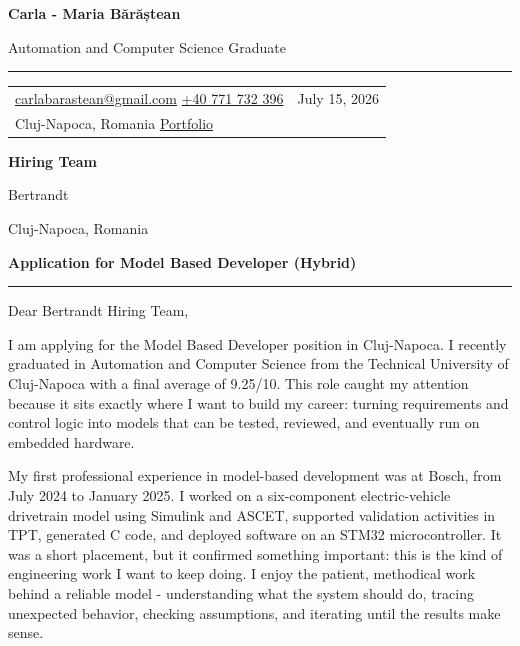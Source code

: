 \documentclass[11pt,a4paper]{article}
\newcommand{\contactseparator}{\hspace{0.55em}{\color{CVAccent}\textbar}\hspace{0.55em}}
\begin{document}
\color{CVInk}

{\fontsize{24}{28}\selectfont\bfseries Carla - Maria Bărăștean}\par
\vspace{0.08cm}
{\large Automation and Computer Science Graduate}\par

\vspace{0.28cm}
{\color{CVAccent}\rule{\textwidth}{1.2pt}}
\vspace{0.18cm}

\begin{tabularx}{\textwidth}{@{}Xr@{}}
\href{mailto:carlabarastean@gmail.com}{carlabarastean@gmail.com}
\contactseparator
\href{tel:+40771732396}{+40 771 732 396}
& July 15, 2026 \\
Cluj-Napoca, Romania
\contactseparator
\href{https://portofolio-carla-barastean.netlify.app}{Portfolio}
& \\
\end{tabularx}

\vspace{0.55cm}
\textbf{Hiring Team}\par
Bertrandt\par
Cluj-Napoca, Romania

\vspace{0.42cm}
{\large\bfseries Application for Model Based Developer (Hybrid)}\par
{\color{CVAccent}\rule{5.7cm}{0.8pt}}

\vspace{0.28cm}
Dear Bertrandt Hiring Team,

I am applying for the Model Based Developer position in Cluj-Napoca. I recently graduated in Automation and Computer Science from the Technical University of Cluj-Napoca with a final average of 9.25/10. This role caught my attention because it sits exactly where I want to build my career: turning requirements and control logic into models that can be tested, reviewed, and eventually run on embedded hardware.

My first professional experience in model-based development was at Bosch, from July 2024 to January 2025. I worked on a six-component electric-vehicle drivetrain model using Simulink and ASCET, supported validation activities in TPT, generated C code, and deployed software on an STM32 microcontroller. It was a short placement, but it confirmed something important: this is the kind of engineering work I want to keep doing. I enjoy the patient, methodical work behind a reliable model - understanding what the system should do, tracing unexpected behavior, checking assumptions, and iterating until the results make sense.
\end{document}
